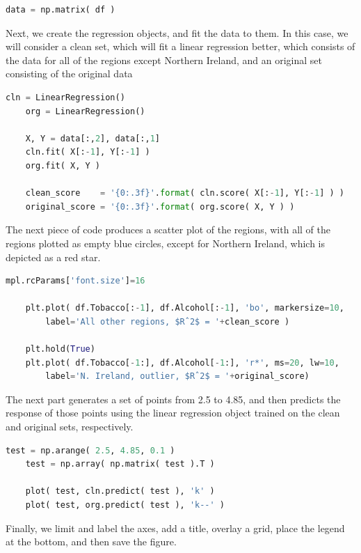 \begin{lstlisting}[language=Python]	
    data = np.matrix( df )
\end{lstlisting}

Next, we create the regression objects, and fit the data to them. In this case, we will consider a clean set, which will fit a linear regression better, which consists of the data for all of the regions except Northern Ireland, and an original set consisting of the original data

\begin{lstlisting}[language=Python]	
    cln = LinearRegression()
    org = LinearRegression()

    X, Y = data[:,2], data[:,1]
    cln.fit( X[:-1], Y[:-1] )
    org.fit( X, Y )

    clean_score    = '{0:.3f}'.format( cln.score( X[:-1], Y[:-1] ) )
    original_score = '{0:.3f}'.format( org.score( X, Y ) )
\end{lstlisting}

The next piece of code produces a scatter plot of the regions, with all of the regions plotted as empty blue circles, except for Northern Ireland, which is depicted as a red star.

\begin{lstlisting}[language=Python]
    mpl.rcParams['font.size']=16

    plt.plot( df.Tobacco[:-1], df.Alcohol[:-1], 'bo', markersize=10,
        label='All other regions, $Rˆ2$ = '+clean_score )

    plt.hold(True)
    plt.plot( df.Tobacco[-1:], df.Alcohol[-1:], 'r*', ms=20, lw=10,
        label='N. Ireland, outlier, $Rˆ2$ = '+original_score)
\end{lstlisting}

The next part generates a set of points from 2.5 to 4.85, and then predicts the response of those points using the linear regression object trained on the clean and original sets, respectively.

\begin{lstlisting}[language=Python]
    test = np.arange( 2.5, 4.85, 0.1 )
    test = np.array( np.matrix( test ).T )

    plot( test, cln.predict( test ), 'k' )
    plot( test, org.predict( test ), 'k--' )
\end{lstlisting}

Finally, we limit and label the axes, add a title, overlay a grid, place the legend at the bottom, and then save the figure.

